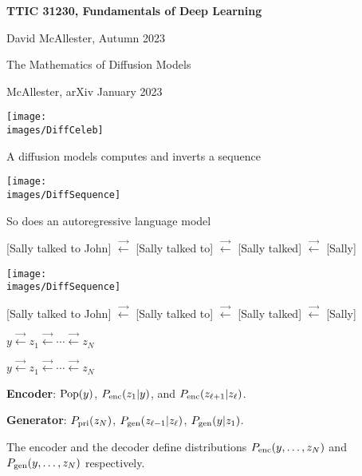 





{\Huge

  \centerline{\bf TTIC 31230, Fundamentals of Deep Learning}
  \bigskip
  \centerline{David McAllester, Autumn 2023}
  \vfill
  \vfil
  \centerline{The Mathematics of Diffusion Models}
  \vfill
  \centerline{McAllester, arXiv January 2023}
    \vfill
  \vfill


\centerline{\texttt{[image: \\images/DiffCeleb]}}



A diffusion models computes and inverts a sequence

\vfill
\centerline{\texttt{[image: \\images/DiffSequence]}}

\vfill
So does an autoregressive language model

\vfill
{\huge
\centerline{{\color{red} [Sally talked to John]} $\stackrel{\rightarrow}{\leftarrow}$ {\color{red} [Sally talked to]}
$\stackrel{\rightarrow}{\leftarrow}$ {\color{red}[Sally talked]} $\stackrel{\rightarrow}{\leftarrow}$ {\color{red}[Sally]}}
}




\centerline{\texttt{[image: \\images/DiffSequence]}}

\vfill
{\huge
\centerline{{\color{red} [Sally talked to John]} $\stackrel{\rightarrow}{\leftarrow}$ {\color{red} [Sally talked to]}
$\stackrel{\rightarrow}{\leftarrow}$ {\color{red}[Sally talked]} $\stackrel{\rightarrow}{\leftarrow}$ {\color{red}[Sally]}}
}

\vfill
\centerline{$y \stackrel{\rightarrow}{\leftarrow} z_1  \stackrel{\rightarrow}{\leftarrow} \cdots \stackrel{\rightarrow}{\leftarrow} z_N$}

\centerline{$y \stackrel{\rightarrow}{\leftarrow} z_1  \stackrel{\rightarrow}{\leftarrow} \cdots \stackrel{\rightarrow}{\leftarrow} z_N$}

\vfill
{\bf Encoder}: $\mathrm{Pop}(y)$, $P_{\mathrm{enc}}(z_1|y)$, and $P_{\mathrm{enc}}(z_{\ell+1}|z_\ell)$.


\vfill
{\bf Generator}: $P_{\mathrm{pri}}(z_N)$, $P_{\mathrm{gen}}(z_{\ell-1}|z_\ell)$, $P_{\mathrm{gen}}(y|z_1)$.

\vfill
The encoder and the decoder define distributions $P_{\mathrm{enc}}(y,\ldots,z_N)$ and $P_{\mathrm{gen}}(y,\ldots,z_N)$ respectively.

}
